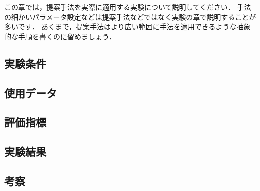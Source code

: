 この章では，提案手法を実際に適用する実験について説明してください．
手法の細かいパラメータ設定などは提案手法などではなく実験の章で説明することが多いです．
あくまで，提案手法はより広い範囲に手法を適用できるような抽象的な手順を書くのに留めましょう．
\subsection{実験条件}

\subsection{使用データ}

\subsection{評価指標}

\subsection{実験結果}

\subsection{考察}